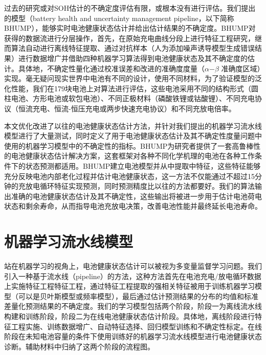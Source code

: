 \documentclass{article}
\begin{document}
过去的研究或对SOH估计的不确定度评估有限，或根本没有进行评估\cite{Hu2012, Feng2015, Andre2011, ref11, ref12, Prasad2013, Severson2019, Saha2008, Goebel2008, Hu2015, Klass2014, Attia2020, Coleman2008, Waag2013, Tröltzsch2006, Birkl2017, Li2019, Li2018a, ref26, Feng2019, Li2018b, Dubarry2006, Weng2013, Yang2018, Richardson2018, ref33, ref34, Ben-Shimon2006, Wang2018}。我们提出的模型（battery health and uncertainty management pipeline，以下简称BHUMP），能够实时电池健康状态估计并给出估计结果的不确定度。BHUMP对获得的数据流进行分层操作，首先，在原始充电曲线分段上进行特征工程研究，继而算法自动进行离线特征提取、通过对抗样本（人为添加噪声诱导模型生成错误结果）进行数据增广并借助四种机器学习算法得到电池健康状态及其不确定度的估计。具体地，不确定性量化通过校准误差和改进的准确度度量（$\alpha$−$\beta$ 准确度区域）实现。毫无疑问现实世界中电池有不同的设计\cite{ref38}，使用不同材料\cite{Seh2016}，为了验证模型的泛化性能，我们在179块电池上对算法进行评估，这些电池采用不同的结构形式（圆柱电池、方形电池或软包电池）、不同正极材料（磷酸铁锂或钴酸锂）、不同充电协议（恒流充电、恒流-恒压充电或两步快速充电协议）和不同充放电倍率。

本文优化改进了以往的电池健康状态估计方法，并针对我们提出的机器学习流水线模型进行了大量测试，同时定义了用于电池健康状态估计及其不确定性度量问题中使用的机器学习模型中的不确定性的指标。BHUMP为研究者提供了一套高鲁棒性的电池健康状态估计解决方案，这套框架对各种不同化学机理的电池在各种工作条件下的状态预测都适用。BHUMP建立电池模型并从中提取中特征，这些特征能够充分反映电池内部老化过程并估计电池健康状态，这一方法不仅能通过不超过15分钟的充放电循环特征实现预测，同时预测精度比以往的方法都要好。我们的算法输出准确的电池健康状态估计及其不确定性，这些输出将被进一步用于估计电池荷电状态和剩余寿命，从而指导电池充放电决策，改善电池性能并最终延长电池寿命。

\section{机器学习流水线模型}

站在机器学习的视角上，电池健康状态估计可以被视为多变量监督学习问题。我们引入一种基于流水线（pipeline）的方法，这种方法首先在电池充电/放电循环数据上实施特征工程特征工程，通过特征工程提取的强相关特征被用于训练机器学习模型（可以是贝叶斯模型或频率模型），最后通过估计预测结果的分布的均值和标准差量化预测结果的不确定度。我们的学习模型包括两个阶段，阶段一为离线流水线构建和训练阶段，阶段二为在线电池健康状态估计阶段。具体地，离线阶段进行特征工程实施、训练数据增广、自动特征选择、回归模型训练和不确定性标定。在线阶段在未知电池容量的条件下使用训练好的机器学习流水线模型进行电池健康状态诊断。辅助材料中归纳了这两个阶段的流程图。
\end{document}
